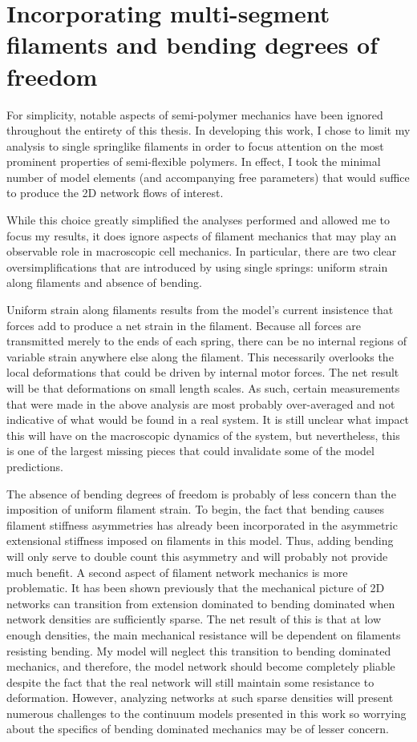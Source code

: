 \section{Incorporating multi-segment filaments and bending degrees of freedom}
For simplicity, notable aspects of semi-polymer mechanics have been ignored throughout the entirety of this thesis.  In developing this work, I chose to limit my analysis to single springlike filaments in order to focus attention on the most prominent properties of semi-flexible polymers. In effect, I took the minimal number of model elements (and accompanying free parameters) that would suffice to produce the 2D network flows of interest. 

While this choice greatly simplified the analyses performed and allowed me to focus my results, it does ignore aspects of filament mechanics that may play an observable role in macroscopic cell mechanics.  In particular, there are two clear oversimplifications that are introduced by using single springs: uniform strain along filaments and absence of bending.

Uniform strain along filaments results from the model's current insistence that forces add to produce a net strain in the filament.  Because all forces are transmitted merely to the ends of each spring, there can be no internal regions of variable strain anywhere else along the filament.  This necessarily overlooks the local deformations that could be driven by internal motor forces.  The net result will be that deformations on small length scales.    As such, certain measurements that were made in the above analysis are most probably over-averaged and not indicative of what would be found in a real system.  It is still unclear what impact this will have on the macroscopic dynamics of the system, but nevertheless, this is one of the largest missing pieces that could invalidate some of the model predictions.

The absence of bending degrees of freedom is probably of less concern than the imposition of uniform filament strain. To begin, the fact that bending causes filament stiffness asymmetries has already been incorporated in the asymmetric extensional stiffness imposed on filaments in this model.  Thus, adding bending will only serve to double count this asymmetry and will probably not provide much benefit. A second aspect of filament network mechanics is more problematic.  It has been shown previously that the mechanical picture of 2D networks can transition from extension dominated to bending dominated when network densities are sufficiently sparse.  The net result of this is that at low enough densities, the main mechanical resistance will be dependent on filaments resisting bending.  My model will neglect this transition to bending dominated mechanics, and therefore, the model network should become completely pliable despite the fact that the real network will still maintain some resistance to deformation.  However, analyzing networks at such sparse densities will present numerous challenges to the continuum models presented in this work so worrying about the specifics of bending dominated mechanics may be of lesser concern.

